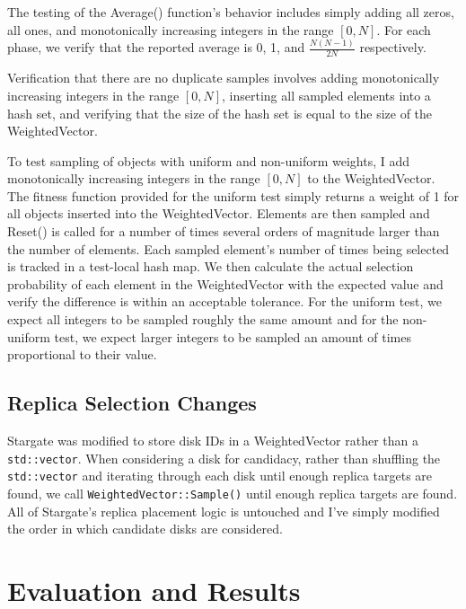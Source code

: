 \documentclass[12pt]{article}
\begin{document}
    The testing of the Average() function's behavior includes simply adding all
    zeros, all ones, and monotonically increasing integers in the range
    $[0,N]$. For each phase, we verify that the reported average is 0, 1, and
    $\frac{N(N-1)}{2N}$ respectively.  

    Verification that there are no duplicate samples involves adding
    monotonically increasing integers in the range $[0,N]$, inserting all
    sampled elements into a hash set, and verifying that the size of the hash
    set is equal to the size of the WeightedVector.

    To test sampling of objects with uniform and non-uniform weights, I add
    monotonically increasing integers in the range $[0,N]$ to the
    WeightedVector. The fitness function provided for the uniform test simply
    returns a weight of 1 for all objects inserted into the WeightedVector.
    Elements are then sampled and Reset() is called for a number of times
    several orders of magnitude larger than the number of elements. Each
    sampled element's number of times being selected is tracked in a test-local
    hash map. We then calculate the actual selection probability of each
    element in the WeightedVector with the expected value and verify the
    difference is within an acceptable tolerance. For the uniform test, we
    expect all integers to be sampled roughly the same amount and for the
    non-uniform test, we expect larger integers to be sampled an amount of
    times proportional to their value.

  \subsection{Replica Selection Changes}
    
  Stargate was modified to store disk IDs in a WeightedVector rather than a
  \verb|std::vector|. When considering a disk for candidacy, rather than
  shuffling the \verb|std::vector| and iterating through each disk until enough
  replica targets are found, we call \verb|WeightedVector::Sample()| until
  enough replica targets are found. All of Stargate's replica placement logic
  is untouched and I've simply modified the order in which candidate disks are
  considered.
      

\section{Evaluation and Results}
\end{document}
